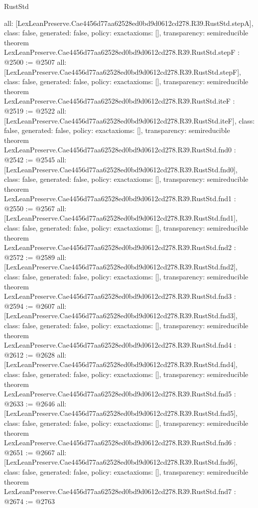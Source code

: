 \begin{lexlean}{RustStd}
\begin{coremodule}
{  all: [LexLeanPreserve.Cae4456d77aa62528ed0bd9d0612cd278.R39.RustStd.stepA],
  class: false,
  generated: false,
  policy: exact{axioms: []},
  transparency: semireducible
}
theorem LexLeanPreserve.Cae4456d77aa62528ed0bd9d0612cd278.R39.RustStd.stepF : @2500 := @2507 {
  all: [LexLeanPreserve.Cae4456d77aa62528ed0bd9d0612cd278.R39.RustStd.stepF],
  class: false,
  generated: false,
  policy: exact{axioms: []},
  transparency: semireducible
}
theorem LexLeanPreserve.Cae4456d77aa62528ed0bd9d0612cd278.R39.RustStd.iteF : @2519 := @2522 {
  all: [LexLeanPreserve.Cae4456d77aa62528ed0bd9d0612cd278.R39.RustStd.iteF],
  class: false,
  generated: false,
  policy: exact{axioms: []},
  transparency: semireducible
}
theorem LexLeanPreserve.Cae4456d77aa62528ed0bd9d0612cd278.R39.RustStd.fnd0 : @2542 := @2545 {
  all: [LexLeanPreserve.Cae4456d77aa62528ed0bd9d0612cd278.R39.RustStd.fnd0],
  class: false,
  generated: false,
  policy: exact{axioms: []},
  transparency: semireducible
}
theorem LexLeanPreserve.Cae4456d77aa62528ed0bd9d0612cd278.R39.RustStd.fnd1 : @2550 := @2567 {
  all: [LexLeanPreserve.Cae4456d77aa62528ed0bd9d0612cd278.R39.RustStd.fnd1],
  class: false,
  generated: false,
  policy: exact{axioms: []},
  transparency: semireducible
}
theorem LexLeanPreserve.Cae4456d77aa62528ed0bd9d0612cd278.R39.RustStd.fnd2 : @2572 := @2589 {
  all: [LexLeanPreserve.Cae4456d77aa62528ed0bd9d0612cd278.R39.RustStd.fnd2],
  class: false,
  generated: false,
  policy: exact{axioms: []},
  transparency: semireducible
}
theorem LexLeanPreserve.Cae4456d77aa62528ed0bd9d0612cd278.R39.RustStd.fnd3 : @2594 := @2607 {
  all: [LexLeanPreserve.Cae4456d77aa62528ed0bd9d0612cd278.R39.RustStd.fnd3],
  class: false,
  generated: false,
  policy: exact{axioms: []},
  transparency: semireducible
}
theorem LexLeanPreserve.Cae4456d77aa62528ed0bd9d0612cd278.R39.RustStd.fnd4 : @2612 := @2628 {
  all: [LexLeanPreserve.Cae4456d77aa62528ed0bd9d0612cd278.R39.RustStd.fnd4],
  class: false,
  generated: false,
  policy: exact{axioms: []},
  transparency: semireducible
}
theorem LexLeanPreserve.Cae4456d77aa62528ed0bd9d0612cd278.R39.RustStd.fnd5 : @2633 := @2646 {
  all: [LexLeanPreserve.Cae4456d77aa62528ed0bd9d0612cd278.R39.RustStd.fnd5],
  class: false,
  generated: false,
  policy: exact{axioms: []},
  transparency: semireducible
}
theorem LexLeanPreserve.Cae4456d77aa62528ed0bd9d0612cd278.R39.RustStd.fnd6 : @2651 := @2667 {
  all: [LexLeanPreserve.Cae4456d77aa62528ed0bd9d0612cd278.R39.RustStd.fnd6],
  class: false,
  generated: false,
  policy: exact{axioms: []},
  transparency: semireducible
}
theorem LexLeanPreserve.Cae4456d77aa62528ed0bd9d0612cd278.R39.RustStd.fnd7 : @2674 := @2763 {
}
\end{coremodule}
\end{lexlean}
